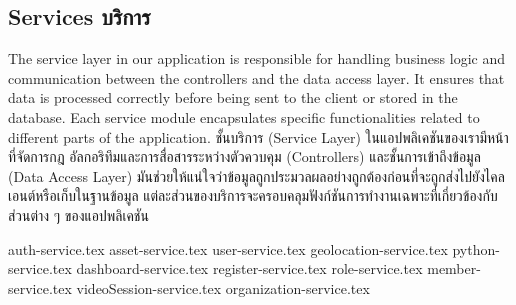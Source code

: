 \subsection{\ifenglish Services \else บริการ \fi}

\ifenglish
The service layer in our application is responsible for handling business logic and communication between the controllers and the data access layer. It ensures that data is processed correctly before being sent to the client or stored in the database. Each service module encapsulates specific functionalities related to different parts of the application.
\else
ชั้นบริการ (Service Layer) ในแอปพลิเคชันของเรามีหน้าที่จัดการกฎ อัลกอริทึมและการสื่อสารระหว่างตัวควบคุม (Controllers) และชั้นการเข้าถึงข้อมูล (Data Access Layer) มันช่วยให้แน่ใจว่าข้อมูลถูกประมวลผลอย่างถูกต้องก่อนที่จะถูกส่งไปยังไคลเอนต์หรือเก็บในฐานข้อมูล แต่ละส่วนของบริการจะครอบคลุมฟังก์ชันการทำงานเฉพาะที่เกี่ยวข้องกับส่วนต่าง ๆ ของแอปพลิเคชัน
\fi

\newcommand{\serviceDir}{chapters/approach/backend/services}
{auth-service.tex}
{asset-service.tex}
{user-service.tex}
{geolocation-service.tex}
{python-service.tex}
{dashboard-service.tex}
{register-service.tex}
{role-service.tex}
{member-service.tex}
{videoSession-service.tex}
{organization-service.tex}